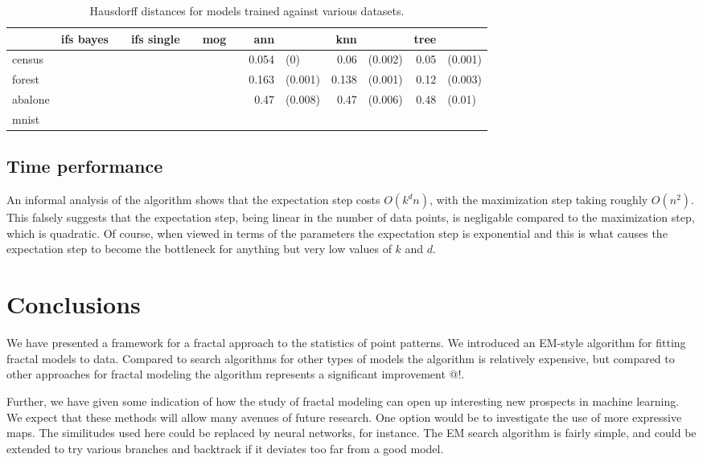 \documentclass[10pt,a4paper,oneside]{article}
\theoremstyle{definition}
\begin{document}
\begin{table}
\begin{tabular}{| l | r l r l | r l r l  r l r l |}
\hline
  & ifs bayes & & ifs single & & mog & & ann & & knn & & tree & \\
\hline
census  & & & & & & & 0.054 &\color{gray}(0) & 0.06 & \color{gray} (0.002) & 0.05 & \color{gray} (0.001) \\
forest  & & & & & & & 0.163 &\color{gray}(0.001) & 0.138 &\color{gray}(0.001) & 0.12&\color{gray}(0.003) \\
abalone & & & & & & & 0.47 & \color{gray}(0.008) & 0.47 & \color{gray}(0.006) & 0.48 & \color{gray}(0.01) \\
mnist   & & & & & & & & & & & & \\
\hline

\end{tabular}
\caption{Hausdorff distances for models trained against various datasets.}
\label{classification-results}
\end{table}
\subsection{Time performance}

An informal analysis of the algorithm shows that the expectation step costs $O(k^dn)$, with the maximization step taking roughly $O(n^2)$. This falsely suggests that the expectation step, being linear in the number of data points, is negligable compared to the maximization step, which is quadratic. Of course, when viewed in terms of the parameters the expectation step is exponential and this is what causes the expectation step to become the bottleneck for anything but very low values of $k$ and $d$. 

\section*{Conclusions}

We have presented a framework for a fractal approach to the statistics of point patterns. We introduced an EM-style algorithm for fitting fractal models to data. Compared to search algorithms for other types of models the algorithm is relatively expensive, but compared to other approaches for fractal modeling the algorithm represents a significant improvement @!. 

Further, we have given some indication of how the study of fractal modeling can open up interesting new prospects in machine learning. We expect that these methods will allow many avenues of future research. One option would be to investigate the use of more expressive maps. The similitudes used here could be replaced by neural networks, for instance. The EM search algorithm is fairly simple, and could be extended to try various branches and backtrack if it deviates too far from a good model.
\end{document}
